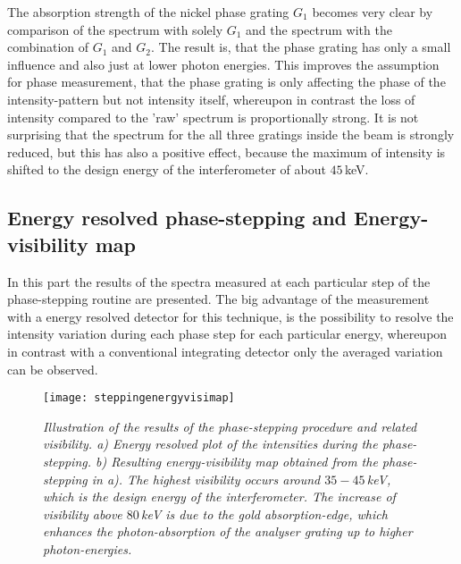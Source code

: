 The absorption strength of the nickel phase grating $G_{1}$ becomes very clear by comparison of the spectrum with solely $G_{1}$ and the spectrum with the combination of $G_{1}$ and $G_{2}$. The result is, that the phase grating has only a small influence and also just at lower photon energies. This improves the assumption for phase measurement, that the phase grating is only affecting the phase of the intensity-pattern but not intensity itself, whereupon in contrast the loss of intensity compared to the 'raw' spectrum is proportionally strong. It is not surprising that the spectrum for the all three gratings inside the beam is strongly reduced, but this has also a positive effect, because the maximum of intensity is shifted to the design energy of the interferometer of about $45\,$keV. 
\subsection{Energy resolved phase-stepping and Energy-visibility map}\label{subsec:ephasestep}
In this part the results of the spectra measured at each particular step of the phase-stepping routine are presented. The big advantage of the measurement with a energy resolved detector for this technique, is the possibility to resolve the intensity variation during each phase step for each particular energy, whereupon in contrast with a conventional integrating detector only the averaged variation can be observed. 
\begin{figure}%
	\begin{center}
		\texttt{[image: steppingenergyvisimap]}
	\end{center}
	\caption[Energy resolved stepping and energy-visibility map]{\textit{Illustration of the results of the phase-stepping procedure and related visibility. a) Energy resolved plot of the intensities during the phase-stepping. b) Resulting energy-visibility map obtained from the phase-stepping in a). The highest visibility occurs around $35-45\,$keV, which is the design energy of the interferometer. The increase of visibility above $80\,$keV is due to the gold absorption-edge, which enhances the photon-absorption of the analyser grating up to higher photon-energies.}}
	\label{stepvisi}
\end{figure}
